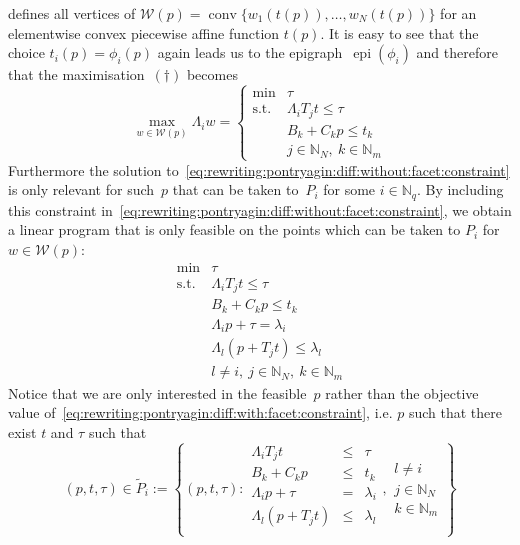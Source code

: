 \documentclass[smallextended]{svjour3}       %
\numberwithin{equation}{section}
\DeclareMathOperator*{\conv}{conv}
\DeclareMathOperator{\epi}{epi}
\begin{document}
%
defines all vertices of $\mathcal W(p) = \conv\bigl\{w_1(t(p)),\dots,w_N(t(p))\bigr\}$ for an elementwise convex piecewise affine function $t(p)$.
%
It is easy to see that the choice $t_i(p)=\phi_i(p)$ again leads us to the epigraph~$\epi(\phi_i)$ and therefore that the maximisation~$(\dagger)$ becomes
%
\begin{equation}\label{eq:rewriting:pontryagin:diff:without:facet:constraint}
  \max_{w\in\mathcal W(p)}\Lambda_i w = \left\{\begin{array}{rl}
  \min& \tau\\
  \text{s.t.}& \Lambda_iT_jt\leq\tau\\
  & B_k+C_k p \leq t_k\\
  & j\in\mathbb N_N, \ k\in\mathbb N_m 
  \end{array}\right.
\end{equation}
%
Furthermore the solution to~\eqref{eq:rewriting:pontryagin:diff:without:facet:constraint} is only relevant for such~$p$ that can be taken to~$P_i$ for some $i\in\mathbb N_q$.
%
By including this constraint in~\eqref{eq:rewriting:pontryagin:diff:without:facet:constraint}, we obtain a linear program that is only feasible on the points which can be taken to $P_i$ for $w\in\mathcal W(p)$:
%
\begin{equation}\label{eq:rewriting:pontryagin:diff:with:facet:constraint}
  \begin{array}{rl}
  \min& \tau\\
  \text{s.t.}& \Lambda_iT_jt\leq\tau\\
  & B_k+C_k p\leq t_k\\
  &\Lambda_i p + \tau=\lambda_i\\
  &\Lambda_l(p + T_jt)\leq\lambda_l\\
  &l\neq i, \ j\in\mathbb N_N, \ k\in\mathbb N_m 
  \end{array}
\end{equation}
%
Notice that we are only interested in the feasible~$p$ rather than the objective value of~\eqref{eq:rewriting:pontryagin:diff:with:facet:constraint}, i.e. $p$ such that there exist $t$ and $\tau$ such that 
%
\[%
  (p,t,\tau)\in\tilde P_i :=\left\{(p,t,\tau):\begin{array}{rcl}
  \Lambda_iT_jt&\leq&\tau\\
  B_k+C_k p&\leq& t_k\\
  \Lambda_i p + \tau&=&\lambda_i\\
  \Lambda_l(p + T_jt)&\leq&\lambda_l\\
  \end{array},\begin{array}{l}
   l\neq i\\
   j\in\mathbb N_N\\
   k\in\mathbb N_m
   \end{array}
   \right\}
\]%
\end{document}
